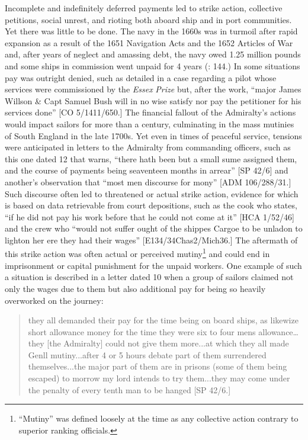 Incomplete and indefinitely deferred payments led to strike action, collective petitions, social unrest, and rioting both aboard ship and in port communities. Yet there was little to be done. The navy in the 1660s was in turmoil after rapid expansion as a result of the 1651 Navigation Acts and the 1652 Articles of War and, after years of neglect and amassing debt, the navy owed 1.25 million pounds and some ships in commission went unpaid for 4 years (\citealt{Lincoln2015}: 144.) In some situations pay was outright denied, such as detailed in a case regarding a pilot whose services were commissioned by the \textit{Essex} \textit{Prize} but, after the work, “major James Willson \& Capt Samuel Bush will in no wise satisfy nor pay the petitioner for his services done” [CO 5/1411/650.] The financial fallout of the Admiralty’s actions would impact sailors for more than a century, culminating in the mass mutinies of South England in the late 1700s. Yet even in times of peaceful service, tensions were anticipated in letters to the Admiralty from commanding officers, such as this one dated 12 \citealt{March1700} that warns, “there hath been but a small sume assigned them, and the course of payments being seaventeen months in arrear” [SP 42/6] and another’s observation that “most men discourse for mony” [ADM 106/288/31.] Such discourse often led to threatened or actual strike action, evidence for which is based on data retrievable from court depositions, such as the cook who states, “if he did not pay his work before that he could not come at it” [HCA 1/52/46] and the crew who “would not suffer ought of the shippes Cargoe to be unladon to lighton her ere they had their wages” [E134/34Chas2/Mich36.] The aftermath of this strike action was often actual or perceived mutiny\footnote{“Mutiny” was defined loosely at the time as any collective action contrary to superior ranking officials.} and could end in imprisonment or capital punishment for the unpaid workers. One example of such a situation is described in a letter dated 10 \citealt{December1700} when a group of sailors claimed not only the wages due to them but also additional pay for being so heavily overworked on the journey:

\begin{quotation}
they all demanded their pay for the time being on board ships, as likewize short allowance money for the time they were six to four mens allowance… they [the Admiralty] could not give them more...at which they all made Genll mutiny...after 4 or 5 hours debate part of them surrendered themselves...the major part of them are in prisons (some of them being escaped) to morrow my lord intends to try them...they may come under the penalty of every tenth man to be hanged [SP 42/6.]\end{quotation}

